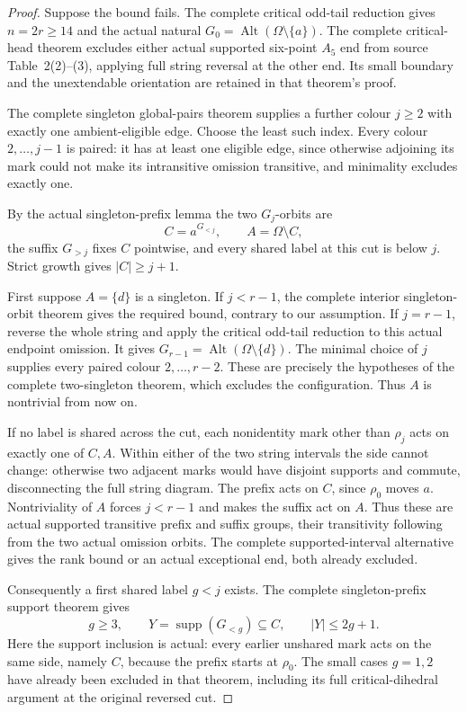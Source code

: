 \documentclass[11pt,a4paper]{article}
\begin{document}
\begin{proof}
Suppose the bound fails. The complete critical odd-tail reduction
gives $n=2r\ge14$ and the actual natural
$G_0=\operatorname{Alt}(\Omega\setminus\{a\})$.
The complete critical-head theorem excludes either actual supported
six-point $A_5$ end from source Table~2(2)--(3), applying full
string reversal at the other end. Its small boundary and the
unextendable orientation are retained in that theorem's proof.

The complete singleton global-pairs theorem supplies a further
colour $j\ge2$ with exactly one ambient-eligible edge. Choose
the least such index. Every colour $2,\ldots,j-1$ is paired:
it has at least one eligible edge, since otherwise adjoining its
mark could not make its intransitive omission transitive, and
minimality excludes exactly one.

By the actual singleton-prefix lemma the two $G_j$-orbits are
\[
 C=a^{G_{<j}},\qquad A=\Omega\setminus C,
\]
the suffix $G_{>j}$ fixes $C$ pointwise, and every shared
label at this cut is below $j$. Strict growth gives $|C|\ge j+1$.

First suppose $A=\{d\}$ is a singleton. If $j<r-1$, the
complete interior singleton-orbit theorem gives the required bound,
contrary to our assumption. If $j=r-1$, reverse the whole string
and apply the critical odd-tail reduction to this actual endpoint
omission. It gives
$G_{r-1}=\operatorname{Alt}(\Omega\setminus\{d\})$.
The minimal choice of $j$ supplies every paired colour
$2,\ldots,r-2$. These are precisely the hypotheses of the complete
two-singleton theorem, which excludes the configuration. Thus
$A$ is nontrivial from now on.

If no label is shared across the cut, each nonidentity mark other
than $\rho_j$ acts on exactly one of $C,A$. Within either of
the two string intervals the side cannot change: otherwise two
adjacent marks would have disjoint supports and commute, disconnecting
the full string diagram. The prefix acts on $C$, since $\rho_0$
moves $a$. Nontriviality of $A$ forces $j<r-1$ and makes the
suffix act on $A$. Thus these are actual supported transitive
prefix and suffix groups, their transitivity following from the
two actual omission orbits. The complete supported-interval
alternative gives the rank bound or an actual exceptional end,
both already excluded.

Consequently a first shared label $g<j$ exists. The complete
singleton-prefix support theorem gives
\[
             g\ge3,\qquad
             Y=\operatorname{supp}(G_{<g})\subseteq C,
             \qquad |Y|\le2g+1.                         \tag{1}
\]
Here the support inclusion is actual: every earlier unshared mark
acts on the same side, namely $C$, because the prefix starts at
$\rho_0$. The small cases $g=1,2$ have already been excluded
in that theorem, including its full critical-dihedral argument
at the original reversed cut.


\end{proof}
\end{document}
